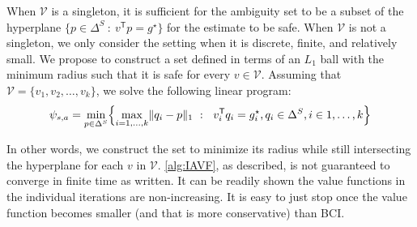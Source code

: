\documentclass{article}
\DeclarePairedDelimiter{\norm}{\lVert}{\rVert}
\newcommand{\opt}{^\star}
\newcommand{\tr}{^{\mathsf{T}}}
\theoremstyle{plain}
\theoremstyle{definition}
\begin{document}
When $\mathcal{V}$ is a singleton, it is sufficient for the ambiguity set to be a subset of the hyperplane $\{ p \in \Delta^S ~:~ v\tr p = g\opt \}$ for the estimate to be safe. When $\mathcal{V}$ is not a singleton, we only consider the setting when it is discrete, finite, and relatively small. We propose to construct a set defined in terms of an $L_1$ ball with the minimum radius such that it is safe for every $v\in\mathcal{V}$. Assuming that $\mathcal{V} = \{v_1, v_2, \ldots, v_k \}$, we solve the following linear program:
\begin{equation} \label{eq:center_point}
\begin{gathered}
\psi_{s,a} = \min_{p\in\Delta^S} \Bigl\{ \max_{i=1,\ldots,k} \norm{q_i - p}_1 ~:~ 
\hspace{0.1cm}  v_i\tr  q_i = g_i\opt, q_i \in \Delta^S, i \in 1,\ldots,k  \Bigr\}
\end{gathered}
\end{equation}

In other words, we construct the set to minimize its radius while still intersecting the hyperplane for each $v$ in $\mathcal{V}$. \cref{alg:IAVF}, as described, is not guaranteed to converge in finite time as written. It can be readily shown the value functions in the individual iterations are non-increasing. It is easy to just stop once the value function becomes smaller (and that is more conservative) than BCI.
\end{document}
